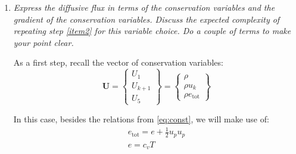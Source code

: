 \documentclass{ucb}
\begin{document}
\begin{enumerate}
\pagebreak

\item \textit{Express the diffusive flux in terms of the conservation variables and the gradient of the conservation variables. Discuss the expected complexity of repeating step \ref{item2} for this variable choice. Do a couple of terms to make your point clear.}
\label{item3}

As a first step, recall the vector of conservation variables:
\begin{equation}
    \bm{U} =
     \begin{Bmatrix}
        U_1 \\
        U_{k+1} \\
        U_5
    \end{Bmatrix}
    =
    \begin{Bmatrix}
        \rho \\
        \rho u_k \\
        \rho e_\mathrm{tot}
    \end{Bmatrix}
\end{equation}

In this case, besides the relations from \autoref{eq:const}, we will make use of:
\begin{subequations}
    \begin{gather}
        e_\mathrm{tot} = e + \frac{1}{2}u_pu_p \\
        e = c_v T
    \end{gather}
\end{subequations}


\end{enumerate}
\end{document}
